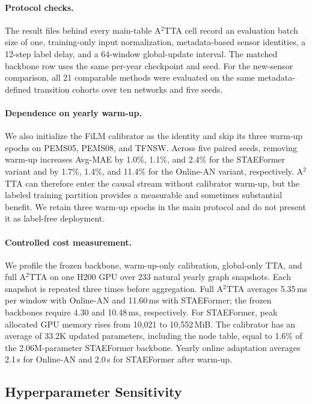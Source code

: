 \paragraph{Protocol checks.}
The result files behind every main-table A$^2$TTA cell record an evaluation
batch size of one, training-only input normalization, metadata-based sensor
identities, a 12-step label delay, and a 64-window global-update interval.
The matched backbone row uses the same per-year checkpoint and seed. For the
new-sensor comparison, all 21 comparable methods were evaluated on the same
metadata-defined transition cohorts over ten networks and five seeds.

\paragraph{Dependence on yearly warm-up.}
We also initialize the FiLM calibrator as the identity and skip its three
warm-up epochs on PEMS05, PEMS08, and TFNSW. Across five paired seeds,
removing warm-up increases Avg-MAE by 1.0\%, 1.1\%, and 2.4\% for the
STAEFormer variant and by 1.7\%, 1.4\%, and 11.4\% for the Online-AN variant,
respectively. A$^2$TTA can therefore enter the causal stream without
calibrator warm-up, but the labeled training partition provides a measurable
and sometimes substantial benefit. We retain three warm-up epochs in the main
protocol and do not present it as label-free deployment.

\paragraph{Controlled cost measurement.}
We profile the frozen backbone, warm-up-only calibration, global-only TTA, and
full A$^2$TTA on one H200 GPU over 233 natural yearly graph snapshots. Each
snapshot is repeated three times before aggregation. Full A$^2$TTA averages
5.35\,ms per window with Online-AN and 11.60\,ms with STAEFormer; the frozen
backbones require 4.30 and 10.48\,ms, respectively. For STAEFormer, peak
allocated GPU memory rises from 10,021 to 10,552\,MiB. The calibrator has an
average of 33.2K updated parameters, including the node table, equal to 1.6\%
of the 2.06M-parameter STAEFormer backbone. Yearly online adaptation averages
2.1\,s for Online-AN and 2.0\,s for STAEFormer after warm-up.


\subsection{Hyperparameter Sensitivity}
\label{app:hyper_details}

